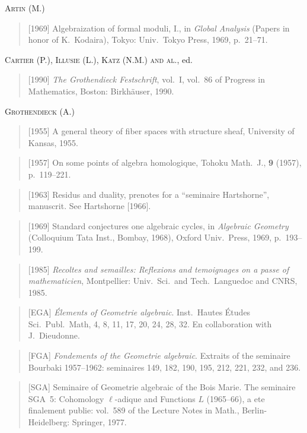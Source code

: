 \documentclass[11pt,a4paper]{article}
\theoremstyle{plain}
\theoremstyle{definition}
\begin{document}
\medskip

\noindent\textsc{Artin (M.)}
\begin{quote}
[1969] Algebraization of formal moduli, I., in \emph{Global Analysis} (Papers in honor of K.~Kodaira), Tokyo: Univ.\ Tokyo Press, 1969, p.~21--71.
\end{quote}

\medskip
\noindent\textsc{Cartier (P.), Illusie (L.), Katz (N.M.) and al.}, ed.
\begin{quote}
[1990] \emph{The Grothendieck Festschrift}, vol.~I, vol.~86 of Progress in Mathematics, Boston: Birkh\"auser, 1990.
\end{quote}

\medskip
\noindent\textsc{Grothendieck (A.)}
\begin{quote}
[1955] A general theory of fiber spaces with structure sheaf, University of Kansas, 1955.
\end{quote}
\begin{quote}
[1957] On some points of algebra homologique, Tohoku Math.\ J., \textbf{9} (1957), p.~119--221.
\end{quote}
\begin{quote}
[1963] Residus and duality, prenotes for a ``seminaire Hartshorne'', manuscrit. See Hartshorne [1966].
\end{quote}
\begin{quote}
[1969] Standard conjectures one algebraic cycles, in \emph{Algebraic Geometry} (Colloquium Tata Inst., Bombay, 1968), Oxford Univ.\ Press, 1969, p.~193--199.
\end{quote}
\begin{quote}
[1985] \emph{Recoltes and semailles: Reflexions and temoignages on a passe of mathematicien}, Montpellier: Univ.\ Sci.\ and Tech.\ Languedoc and CNRS, 1985.
\end{quote}
\begin{quote}
[EGA] \emph{\'Elements of Geometrie algebraic}. Inst.\ Hautes \'Etudes Sci.\ Publ.\ Math, 4, 8, 11, 17, 20, 24, 28, 32. En collaboration with J.~Dieudonne.
\end{quote}
\begin{quote}
[FGA] \emph{Fondements of the Geometrie algebraic}. Extraits of the seminaire Bourbaki 1957--1962: seminaires 149, 182, 190, 195, 212, 221, 232, and 236.
\end{quote}
\begin{quote}
[SGA] Seminaire of Geometrie algebraic of the Bois Marie. The seminaire SGA~5: Cohomology $\ell$-adique and Functions $L$ (1965--66), a ete finalement publie: vol.~589 of the Lecture Notes in Math., Berlin-Heidelberg: Springer, 1977.
\end{quote}
\end{document}
